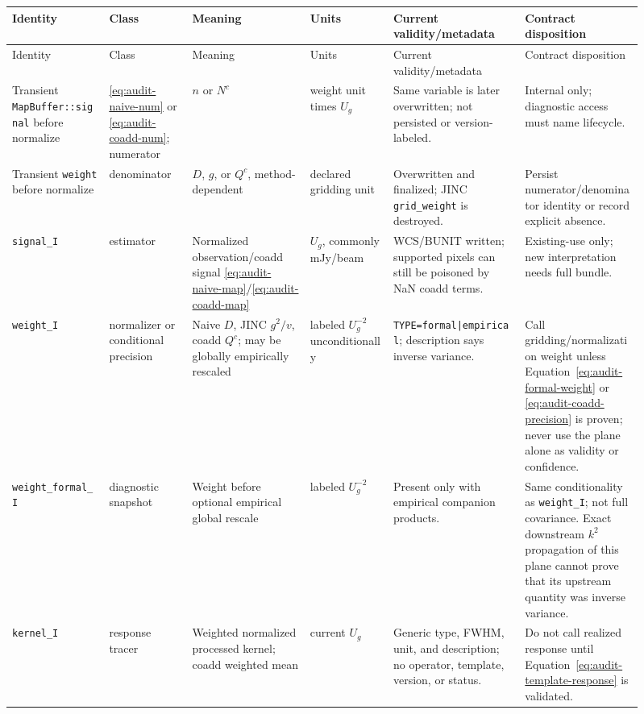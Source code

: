 \documentclass[11pt]{article}
\newcommand{\code}[1]{\nolinkurl{#1}}
\begin{document}
\begin{longtable}{L{0.14\linewidth}L{0.12\linewidth}L{0.17\linewidth}L{0.12\linewidth}L{0.19\linewidth}L{0.17\linewidth}}
\toprule
Identity & Class & Meaning & Units & Current validity/metadata & Contract disposition\\
\midrule
\endfirsthead
\toprule
Identity & Class & Meaning & Units & Current validity/metadata & Contract disposition\\
\midrule
\endhead
Transient \code{MapBuffer::signal} before normalize &
\eqref{eq:audit-naive-num} or \eqref{eq:audit-coadd-num}; numerator & \(n\) or
\(N^c\) & weight unit times \(U_g\) & Same variable is later overwritten;
not persisted or version-labeled. & Internal only; diagnostic access must name
lifecycle.\\
Transient \code{weight} before normalize & denominator & \(D\), \(g\), or
\(Q^c\), method-dependent & declared gridding unit & Overwritten and finalized;
JINC \code{grid_weight} is destroyed. & Persist numerator/denominator identity
or record explicit absence.\\
\code{signal_I} & estimator & Normalized observation/coadd signal
\eqref{eq:audit-naive-map}/\eqref{eq:audit-coadd-map} & \(U_g\), commonly
mJy/beam & WCS/BUNIT written; supported pixels can still be poisoned by NaN
coadd terms. & Existing-use only; new interpretation needs full bundle.\\
\code{weight_I} & normalizer or conditional precision & Naive \(D\), JINC
\(g^2/v\), coadd \(Q^c\); may be globally empirically rescaled & labeled
\(U_g^{-2}\) unconditionally & \code{TYPE=formal|empirical}; description says
inverse variance. & Call gridding/normalization weight unless
Equation~\eqref{eq:audit-formal-weight} or \eqref{eq:audit-coadd-precision} is
proven; never use the plane alone as validity or confidence.\\
\code{weight_formal_I} & diagnostic snapshot & Weight before optional empirical
global rescale & labeled \(U_g^{-2}\) & Present only with empirical companion
products. & Same conditionality as \code{weight_I}; not full covariance.  Exact
downstream \(k^2\) propagation of this plane cannot prove that its upstream
quantity was inverse variance.\\
\code{kernel_I} & response tracer & Weighted normalized processed kernel;
coadd weighted mean & current \(U_g\) & Generic type, FWHM, unit, and
description; no operator, template, version, or status. & Do not call realized response until
Equation~\eqref{eq:audit-template-response} is validated.\\

\end{longtable}
\end{document}
